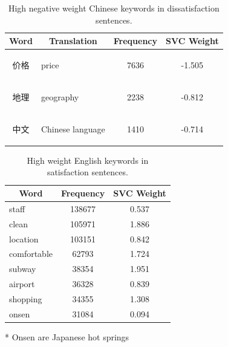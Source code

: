 \documentclass[review]{elsarticle}
\begin{document}
\begin{table}[bp] \centering
\caption{High negative weight Chinese keywords in dissatisfaction sentences.}
\label{tab:neg_keys_zh}
\begin{tabular}{|c|l|c|c|} \hline
\textbf{Word} & \multicolumn{1}{c|}{\textbf{Translation}} & \textbf{Frequency} & \textbf{SVC Weight} \\ \hline
\begin{CJK}{UTF8}{gbsn} 价格 \end{CJK} 
    & price & 7636 & -1.505 \\ \hline
\begin{CJK}{UTF8}{gbsn} 地理 \end{CJK} 
    & geography & 2238 & -0.812 \\ \hline
\begin{CJK}{UTF8}{gbsn} 中文 \end{CJK} 
    & Chinese language & 1410 & -0.714 \\ \hline
\end{tabular}
\end{table}

\begin{table}[bp]
\centering
\caption{High weight English keywords in satisfaction sentences.}
\label{tab:pos_keys_en}
\begin{threeparttable}
\begin{tabular}{|l|c|c|}
\hline
\multicolumn{1}{|c|}{\textbf{Word}} & \textbf{Frequency} & \textbf{SVC Weight} \\ \hline
staff & 138677 & 0.537 \\ \hline
clean & 105971 & 1.886 \\ \hline
location & 103151 & 0.842 \\ \hline
comfortable & 62793 & 1.724 \\ \hline
subway & 38354 & 1.951 \\ \hline
airport & 36328 & 0.839 \\ \hline
shopping & 34355 & 1.308 \\ \hline
onsen \tnote{*} & 31084 & 0.094 \\ \hline
\end{tabular}
\begin{tablenotes}
\item[*]Onsen are Japanese hot springs
\end{tablenotes}
\end{threeparttable}
\end{table}
\end{document}

